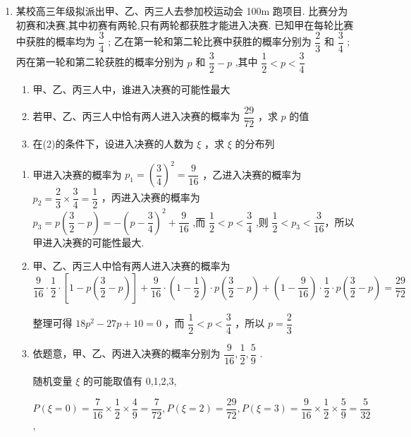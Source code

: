\begin{enumerate}
\begin{enumerate}
        \item 某校高三年级拟派出甲、乙、丙三人去参加校运动会 100m 跑项目. 比赛分为初赛和决赛,其中初赛有两轮,只有两轮都获胜才能进入决赛. 已知甲在每轮比赛中获胜的概率均为 $\dfrac{3}{4}$ ; 乙在第一轮和第二轮比赛中获胜的概率分别为 $\dfrac{2}{3}$ 和 $\dfrac{3}{4}$ ; 丙在第一轮和第二轮获胜的概率分别为 $p$ 和 $\dfrac{3}{2} - p$ ,其中 $\dfrac{1}{2} < p < \dfrac{3}{4}$
        \begin{enumerate}
            \item 甲、乙、丙三人中，谁进入决赛的可能性最大
            \item 若甲、乙、丙三人中恰有两人进入决赛的概率为 $\dfrac{29}{72}$ ，求 $p$ 的值
            \item 在(2)的条件下，设进入决赛的人数为 $\xi$ ，求 $\xi$ 的分布列
        \end{enumerate}
        \begin{jieda}
            \begin{enumerate}
                \item 甲进入决赛的概率为 ${p}_{1} = {\left( \dfrac{3}{4}\right) }^{2} = \dfrac{9}{16}$ ，乙进入决赛的概率为 ${p}_{2} = \dfrac{2}{3} \times  \dfrac{3}{4} = \dfrac{1}{2}$ ，丙进入决赛的概率为 ${p}_{3} = p\left( {\dfrac{3}{2} - p}\right)  =  - {\left( p - \dfrac{3}{4}\right) }^{2} + \dfrac{9}{16}$ ,而 $\dfrac{1}{2} < p < \dfrac{3}{4}$ ,则 $\dfrac{1}{2} < {p}_{3} < \dfrac{3}{16}$，所以甲进入决赛的可能性最大.
                
                \item 甲、乙、丙三人中恰有两人进入决赛的概率为$\dfrac{9}{16} \cdot  \dfrac{1}{2} \cdot  \left\lbrack  {1 - p\left( {\dfrac{3}{2} - p}\right) }\right\rbrack   + \dfrac{9}{16} \cdot  \left( {1 - \dfrac{1}{2}}\right)  \cdot  p\left( {\dfrac{3}{2} - p}\right)  + \left( {1 - \dfrac{9}{16}}\right)  \cdot  \dfrac{1}{2} \cdot  p\left( {\dfrac{3}{2} - p}\right)  = \dfrac{29}{72}$
                
                整理可得 ${18}{p}^{2} - {27p} + {10} = 0$ ，而 $\dfrac{1}{2} < p < \dfrac{3}{4}$ ，所以 $p = \dfrac{2}{3}$
                
                \item 依题意，甲、乙、丙进入决赛的概率分别为 $\dfrac{9}{16},\dfrac{1}{2},\dfrac{5}{9}$ .
                
                随机变量 $\xi$ 的可能取值有 0,1,2,3,
                
                $P\left( {\xi  = 0}\right)  = \dfrac{7}{16} \times  \dfrac{1}{2} \times  \dfrac{4}{9} = \dfrac{7}{72},P\left( {\xi  = 2}\right)  = \dfrac{29}{72},P\left( {\xi  = 3}\right)  = \dfrac{9}{16} \times  \dfrac{1}{2} \times  \dfrac{5}{9} = \dfrac{5}{32}$ ,
                

\end{enumerate}
\end{jieda}
\end{enumerate}
\end{enumerate}
